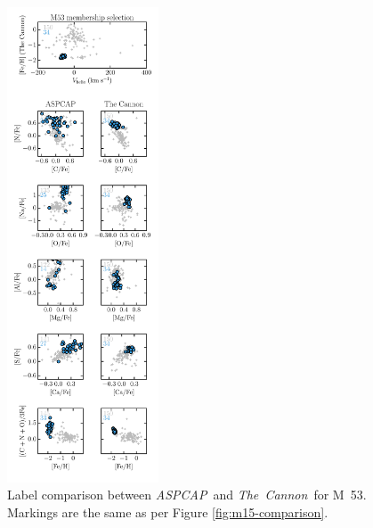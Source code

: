 \documentclass[12pt,preprint]{aastex}
\newcommand{\project}[1]{\textsl{#1}}
\newcommand{\TheCannon}{\project{The~Cannon}}
\newcommand{\acronym}[1]{{\small{#1}}}
\newcommand{\aspcap}{\project{\acronym{ASPCAP}}}
\begin{document}
\begin{figure}[p]
\centering
\includegraphics[width=0.4\textwidth]{M53_comparison.pdf}
\caption{Label comparison between \aspcap\ and \TheCannon\ for M~53.
Markings are the same as per Figure \ref{fig:m15-comparison}.
\label{fig:m53-comparison}}
\end{figure}

\clearpage
\end{document}
